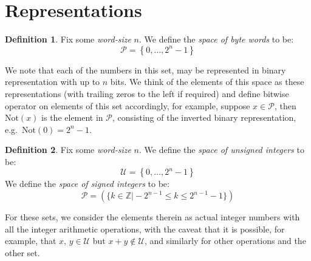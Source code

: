 \documentclass{amsart}
\theoremstyle{plain}
\theoremstyle{definition}
\newtheorem{definition}{Definition}[section]
\theoremstyle{definition}
\theoremstyle{remark}
\begin{document}
\section{Representations}
\begin{definition}
    Fix some \emph{word-size} \(n\). We define the \emph{space of byte words} to be:
    \begin{equation*}
        \mathcal{P} = \left\{0,\ldots,2^{n}-1\right\}
    \end{equation*}
\end{definition}
We note that each of the numbers in this set, may be represented in binary representation with up to \(n\) bits. We think of the elements of this space as these representations (with trailing zeros to the left if required) and define bitwise operator on elements of this set accordingly, for example, suppose \(x \in \mathcal{P}\), then \(\mathrm{Not}\left(x\right)\) is the element in \(\mathcal{P}\), consisting of the inverted binary representation,
e.g.\ \(\mathrm{Not}\left(0\right) = 2^{n}-1\).
\begin{definition}
    Fix some \emph{word-size} \(n\). We define the \emph{space of unsigned integers} to be:
    \begin{equation*}
\mathcal{U} = \left\{0,\ldots,2^{n}-1\right\}
    \end{equation*}
    We define the \emph{space of signed integers} to be:
    \begin{equation*}
        \mathcal{P} = \left(\{k \in \mathbb{Z} \vert -2^{n-1}\leq k \leq 2^{n-1}-1\}\right)
    \end{equation*}
\end{definition}
For these sets, we consider the elements therein as actual integer numbers with all the integer arithmetic operations, with the caveat that it is possible, for example, that \(x,\,y \in \mathcal{U}\) but \(x + y \notin \mathcal{U}\), and similarly for other operations and the other set.
\end{document}
